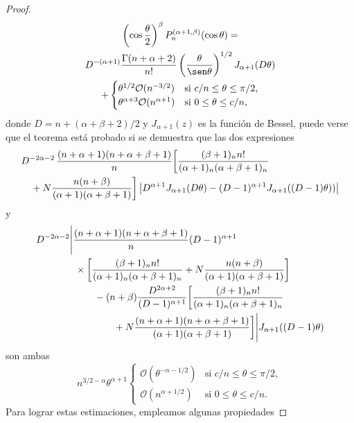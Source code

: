 \documentclass[a4paper]{article}
\newcommand{\calO}{\mathcal{O}}
\begin{document}
\begin{proof}
\begin{multline*}
\left(\cos \frac{\theta}{2}\right)^{\beta} 
 P^{(\alpha+1,\beta)}_{n}(\cos \theta) = \\
D^{-(\alpha+1)} \frac{\Gamma(n+\alpha+2)}{n!}
\left(\frac{\theta}{\sen \theta}\right)^{1/2} J_{\alpha+1}(D\theta) \\
+
\begin{cases}
\theta^{1/2} \calO(n^{-3/2}) & \text{si } c/n \leq \theta \leq \pi/2, \\
\theta^{\alpha+3}\calO(n^{\alpha+1}) & \text{si } 0 \leq \theta \leq c/n,
\end{cases}
\end{multline*}
donde $D = n + (\alpha+\beta+2)/2$ y $J_{\alpha+1}(z)$ 
es la funci\'{o}n de Bessel, puede verse que el teorema est\'{a} 
probado si se demuestra que las dos expresiones
\begin{equation}
\label{eq:5}
\begin{aligned}
&D^{-2\alpha-2} \, \frac{(n+\alpha+1)(n+\alpha+\beta+1)}{n} 
\bigg[ \frac{(\beta+1)_{n} n!}{(\alpha+1)_{n}(\alpha+\beta+1)_{n}} \\
&\quad\null+ N \frac{n(n+\beta)}{(\alpha+1)(\alpha+\beta+1)} \bigg]
\left| D^{\alpha+1} J_{\alpha+1}(D\theta) - 
(D-1)^{\alpha+1} J_{\alpha+1}((D-1)\theta)) \right|
\end{aligned}
\end{equation}
y
\begin{equation}
\label{eq:6}
\begin{aligned}
&D^{-2\alpha-2} \Bigg| \frac{(n+\alpha+{1})(n+\alpha+\beta+1)}{n}
(D-1)^{\alpha+1} \\
&\qquad\qquad\null \times
\bigg[ \frac{(\beta+1)_{n} n!}{(\alpha+1)_{n}(\alpha+\beta+1)_{n}} 
+ N \frac{n(n+\beta)}{(\alpha+1)(\alpha+\beta+1)} \bigg] \\
&\qquad\qquad\qquad\null- (n+\beta)\frac{D^{2\alpha+2}}{(D-1)^{\alpha+1}} 
\bigg[ \frac{(\beta+1)_{n}n!}{(\alpha+1)_{n}(\alpha+\beta+1)_{n}} \\
&\qquad\qquad\qquad\qquad\null+ N \frac{(n+\alpha+1)(n+\alpha+\beta+1)}
{(\alpha+1)(\alpha+\beta+1)} \bigg]
\Bigg| J_{\alpha+1}((D-1)\theta)
\end{aligned}
\end{equation}
son ambas
$$
n^{3/2-\alpha} \theta^{\alpha+1}
\begin{cases}
\calO(\theta^{-\alpha-1/2}) & \text{si } c/n \leq \theta \leq \pi/2, \\
\calO(n^{\alpha+1/2}) & \text{si } 0 \leq \theta \leq c/n.
\end{cases}
$$
Para lograr estas estimaciones, empleamos algunas propiedades 

\end{proof}
\end{document}
